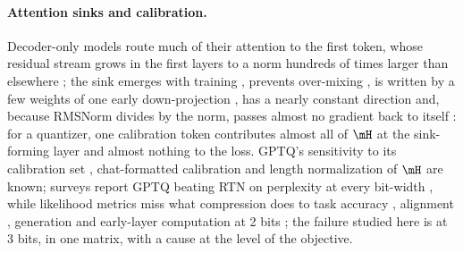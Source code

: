 \paragraph{Attention sinks and calibration.}
Decoder-only models route much of their attention to the first token, whose residual stream grows in the first layers to a norm hundreds of times larger than elsewhere \citep{xiao2024streamingllm,sun2024massive,an2025systematic}; the sink emerges with training \citep{gu2025sink}, prevents over-mixing \citep{barbero2025firsttoken}, is written by a few weights of one early down-projection \citep{yu2024superweight}, has a nearly constant direction \citep{chen2026spikes} and, because RMSNorm divides by the norm, passes almost no gradient back to itself \citep{chen2026gradientsinks}: for a quantizer, one calibration token contributes almost all of $\hess$ at the sink-forming layer and almost nothing to the loss.
GPTQ's sensitivity to its calibration set \citep{williams2024calibration}, chat-formatted calibration \citep{lee2025upq} and length normalization of $\hess$ \citep{son2026maca} are known; surveys report GPTQ beating RTN on perplexity at every bit-width \citep{huang2024llama3quant,zhou2026signalnoise,kumar2025precision}, while likelihood metrics miss what compression does to task accuracy \citep{jaiswal2024kick,lee2025tradeoffs,hu2026damage}, alignment \citep{xu2026alignmentcollapse}, generation \citep{lee2026lfq} and early-layer computation at 2 bits \citep{zhou2026twofailure}; the failure studied here is at 3 bits, in one matrix, with a cause at the level of the objective.

